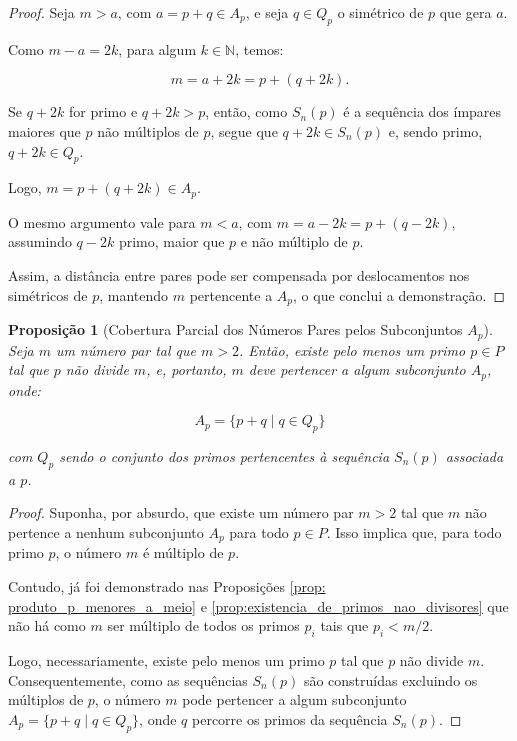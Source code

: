 \documentclass[a4paper,11pt]{article}
\newtheorem{proposition}[theorem]{Proposição}
\theoremstyle{definition}
\theoremstyle{remark}
\begin{document}
\begin{otherlanguage}{brazil}
	\begin{proof}
		Seja \(m > a\), com \(a = p + q \in A_p\), e seja \(q \in Q_p\) o simétrico de \(p\) que gera \(a\).
		
		Como \(m - a = 2k\), para algum \(k \in \mathbb{N}\), temos:
		
		\[
		m = a + 2k = p + (q + 2k).
		\]
		
		Se \(q + 2k\) for primo e \(q + 2k > p\), então, como \(S_n(p)\) é a sequência dos ímpares maiores que \(p\) não múltiplos de \(p\), segue que \(q + 2k \in S_n(p)\) e, sendo primo, \(q + 2k \in Q_p\).
		
		Logo, \(m = p + (q + 2k) \in A_p\).
		
		O mesmo argumento vale para \(m < a\), com \(m = a - 2k = p + (q - 2k)\), assumindo \(q - 2k\) primo, maior que \(p\) e não múltiplo de \(p\).
		
		Assim, a distância entre pares pode ser compensada por deslocamentos nos simétricos de \(p\), mantendo \(m\) pertencente a \(A_p\), o que conclui a demonstração.
	\end{proof}
	
	\begin{proposition}[Cobertura Parcial dos Números Pares pelos Subconjuntos \(A_p\)]\label{prop:cobertura_parcial_dos_pares}
		Seja \(m\) um número par tal que \(m > 2\). Então, existe pelo menos um primo \(p \in P\) tal que \(p\) não divide \(m\), e, portanto, \(m\) deve pertencer a algum subconjunto \(A_p\), onde:
		
		\[
		A_p = \{p + q \mid q \in Q_p\}
		\]
		
		com \(Q_p\) sendo o conjunto dos primos pertencentes à sequência \(S_n(p)\) associada a \(p\).
	\end{proposition}
	
	\begin{proof}
		Suponha, por absurdo, que existe um número par \(m > 2\) tal que \(m\) não pertence a nenhum subconjunto \(A_p\) para todo \(p \in P\). Isso implica que, para todo primo \(p\), o número \(m\) é múltiplo de \(p\).
		
		Contudo, já foi demonstrado nas Proposições \ref{prop: produto_p_menores_a_meio} e \ref{prop:existencia_de_primos_nao_divisores} que não há como \(m\) ser múltiplo de todos os primos \( p_i \) tais que \( p_i < m/2 \). 
		
		Logo, necessariamente, existe pelo menos um primo \(p\) tal que \(p\) não divide \(m\). Consequentemente, como as sequências \(S_n(p)\) são construídas excluindo os múltiplos de \(p\), o número \(m\) pode pertencer a algum subconjunto \(A_p = \{p + q \mid q \in Q_p\}\), onde \(q\) percorre os primos da sequência \(S_n(p)\).
		

\end{proof}
\end{otherlanguage}
\end{document}
